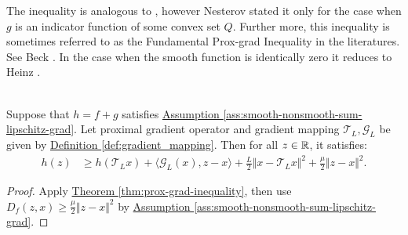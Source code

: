 \documentclass[12pt]{article}
\begin{document}
    \begin{remark}
        The inequality is analogous to \cite[(2.2.57)]{nesterov_lectures_2018}, however Nesterov stated it only for the case when $g$ is an indicator function of some convex set $Q$. 
        Further more, this inequality is sometimes referred to as the Fundamental Prox-grad Inequality in the literatures. 
        See Beck \cite[Theorem 10.16]{beck_first-order_2017}. 
        In the case when the smooth function is identically zero it reduces to Heinz \cite[Proposition 12.26]{bauschke_convex_2017}. 
    \end{remark}

    \begin{lemma}
    \label{lemma:grad_map_linearization}\; \\
        Suppose that $h = f + g$ satisfies 
        \hyperref[ass:smooth-nonsmooth-sum-lipschitz-grad]
        {Assumption \ref*{ass:smooth-nonsmooth-sum-lipschitz-grad}}. 
        Let proximal gradient operator and gradient mapping $\mathcal T_L, \mathcal G_L$ be given by
        \hyperref[def:gradient_mapping]{Definition \ref*{def:gradient_mapping}}. 
        Then for all $z \in \mathbb R$, it satisfies: 
        \begin{align*}
            h(z) &\ge 
            h(\mathcal T_L x) + \langle \mathcal G_L (x), z - x\rangle + 
            \frac{L}{2}\Vert x - \mathcal T_L x\Vert^2 + \frac{\mu}{2}
            \Vert z - x\Vert^2. 
        \end{align*}
    \end{lemma}
    \begin{proof}
        Apply 
        \hyperref[thm:prox-grad-inequality]{Theorem \ref*{thm:prox-grad-inequality}}, 
        then use $D_f(z, x) \ge \frac{\mu}{2}\Vert z - x\Vert^2$ by 
        \hyperref[ass:smooth-nonsmooth-sum-lipschitz-grad]
        {Assumption \ref*{ass:smooth-nonsmooth-sum-lipschitz-grad}}. 
    \end{proof}
   
\end{document}
